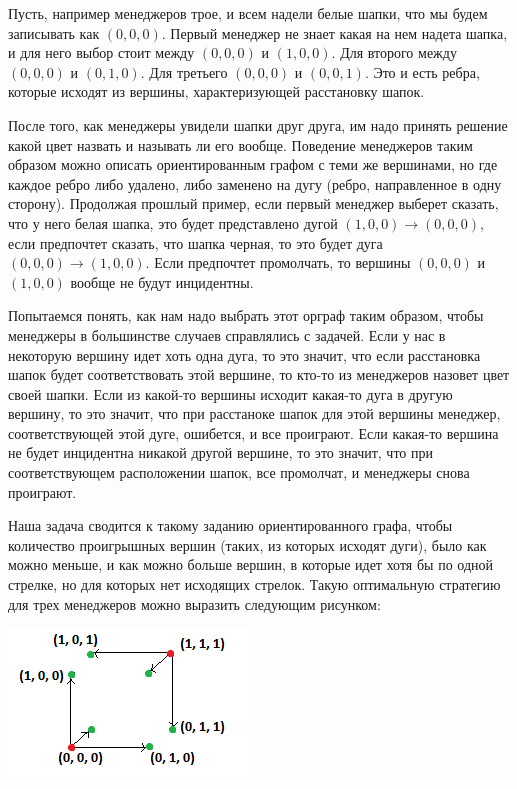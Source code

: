 Пусть, например менеджеров трое, и всем надели белые шапки, что мы будем записывать как $(0, 0, 0)$. Первый менеджер не знает какая на нем надета шапка, и для него выбор стоит между $(0, 0, 0)$ и $(1, 0, 0)$. Для второго между $(0, 0, 0)$ и $(0, 1, 0)$. Для третьего $(0, 0, 0)$ и $(0, 0, 1)$. Это и есть ребра, которые исходят из вершины, характеризующей расстановку шапок.

После того, как менеджеры увидели шапки друг друга, им надо принять решение какой цвет назвать и называть ли его вообще. Поведение менеджеров таким образом можно описать ориентированным графом с теми же вершинами, но где каждое ребро либо удалено, либо заменено на дугу (ребро, направленное в одну сторону). Продолжая прошлый пример, если первый менеджер выберет сказать, что у него белая шапка, это будет представлено дугой $(1,0,0)\to (0, 0, 0)$, если предпочтет сказать, что шапка черная, то это будет дуга $(0, 0, 0)\to (1, 0,0)$. Если предпочтет промолчать, то вершины $(0, 0, 0)$ и $(1, 0, 0)$ вообще не будут инцидентны.

Попытаемся понять, как нам надо выбрать этот орграф таким образом, чтобы менеджеры в большинстве случаев справлялись с задачей. Если у нас в некоторую вершину идет хоть одна дуга, то это значит, что если расстановка шапок будет соответствовать этой вершине, то кто-то из менеджеров назовет цвет своей шапки. Если из какой-то вершины исходит какая-то дуга в другую вершину, то это значит, что при расстаноке шапок для этой вершины менеджер, соответствующей этой дуге, ошибется, и все проиграют. Если какая-то вершина не будет инцидентна никакой другой вершине, то это значит, что при соответствующем расположении шапок, все промолчат, и менеджеры снова проиграют.

Наша задача сводится к такому заданию ориентированного графа, чтобы количество проигрышных вершин (таких, из которых исходят дуги), было как можно меньше, и как можно больше вершин, в которые идет хотя бы по одной стрелке, но для которых нет исходящих стрелок. Такую оптимальную стратегию для трех менеджеров можно выразить следующим рисунком:

\includegraphics{sol3.png}

